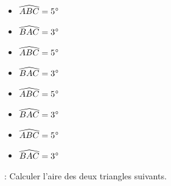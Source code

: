 \begin{minipage}{0.22\textwidth}
    \begin{itemize}
        \item $\widehat{ABC}=5$°
        \item $\widehat{BAC}=3$°
    \end{itemize}
    \begin{center}
        \filling
    \end{center}
\end{minipage}
\hfil
\vrule
\hfil
\begin{minipage}{0.22\textwidth}
    \begin{itemize}
        \item $\widehat{ABC}=5$°
        \item $\widehat{BAC}=3$°
    \end{itemize}
    \begin{center}
        \filling
    \end{center}
\end{minipage}
\hfil
\vrule
\hfil
\begin{minipage}{0.22\textwidth}
    \begin{itemize}
        \item $\widehat{ABC}=5$°
        \item $\widehat{BAC}=3$°
    \end{itemize}
    \begin{center}
        \filling
    \end{center}
\end{minipage}
\hfil
\vrule
\hfil
\begin{minipage}{0.22\textwidth}
    \begin{itemize}
        \item $\widehat{ABC}=5$°
        \item $\widehat{BAC}=3$°
    \end{itemize}
    \begin{center}
        \filling
    \end{center}
\end{minipage}

\newpage

 : Calculer l'aire des deux triangles suivants.


